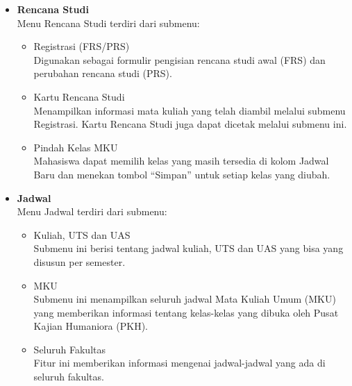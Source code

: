 \begin{enumerate}
\begin{itemize}
		\item \textbf{Rencana Studi}\\
		Menu Rencana Studi terdiri dari submenu: 
		\begin{itemize}
			\item Registrasi (FRS/PRS)\\
			Digunakan sebagai formulir pengisian rencana studi awal (FRS) dan perubahan rencana studi (PRS). 
			\item Kartu Rencana Studi \\
			Menampilkan informasi mata kuliah yang telah diambil melalui submenu Registrasi. Kartu Rencana Studi juga dapat dicetak melalui submenu ini. 
			\item Pindah Kelas MKU \\
			Mahasiswa dapat memilih kelas yang masih tersedia di kolom Jadwal Baru dan menekan tombol ``Simpan'' untuk setiap kelas yang diubah. 
		\end{itemize}
		
		\item \textbf{ Jadwal}\\
		Menu Jadwal terdiri dari submenu: 
		\begin{itemize}
			\item Kuliah, UTS dan UAS \\
			Submenu ini berisi tentang jadwal kuliah, UTS dan UAS yang bisa yang disusun per semester. 
			\item MKU \\
			Submenu ini menampilkan seluruh jadwal Mata Kuliah Umum (MKU) yang memberikan informasi tentang kelas-kelas yang dibuka oleh Pusat Kajian Humaniora (PKH). 
			\item Seluruh Fakultas \\
			Fitur ini memberikan informasi mengenai jadwal-jadwal yang ada di seluruh fakultas.
		\end{itemize}
		

\end{itemize}
\end{enumerate}
